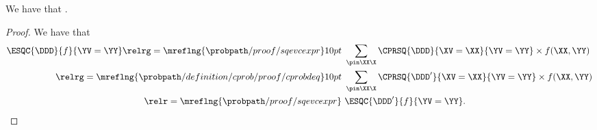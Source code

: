 \begin{proposition}
  We have that \evcdeqprop.%
\end{proposition}

\begin{proof}
  We have that
  \begin{align*}
  \ESQC{\DDD}{f}{\YV = \YY}
  \relrg = {\mreflng{\probpath/proof/sqevcexpr}} 10pt &\ 
  \sum_{\pin\XX\X}\CPRSQ{\DDD}{\XV = \XX}{\YV = \YY} \times f(\XX, \YY)\\
  \relrg = {\mreflng{\probpath/definition/cprob/proof/cprobdeq}} 10pt &\ 
  \sum_{\pin\XX\X}\CPRSQ{\DDD'}{\XV = \XX}{\YV = \YY} \times f(\XX, \YY)\\
  \relr = {\mreflng{\probpath/proof/sqevcexpr}} &\ 
  \ESQC{\DDD'}{f}{\YV = \YY}.
  \end{align*}
\end{proof}
